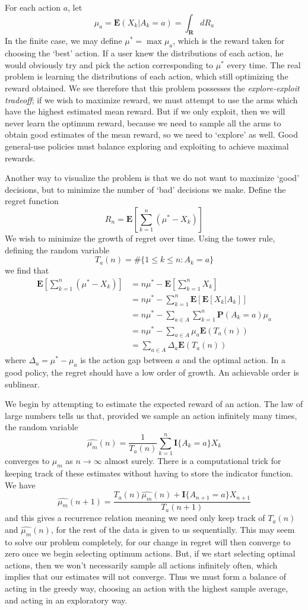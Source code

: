 For each action $a$, let
%
\[ \mu_a = \mathbf{E}(X_k | A_k = a) = \int_\mathbf{R} dR_a \]
%
In the finite case, we may define $\mu^* = \max \mu_a$, which is the reward taken for choosing the `best' action. If a user knew the distributions of each action, he would obviously try and pick the action corresponding to $\mu^*$ every time. The real problem is learning the distributions of each action, which still optimizing the reward obtained. We see therefore that this problem possesses the {\it explore-exploit tradeoff}; if we wish to maximize reward, we must attempt to use the arms which have the highest estimated mean reward. But if we only exploit, then we will never learn the optimum reward, because we need to sample all the arms to obtain good estimates of the mean reward, so we need to `explore' as well. Good general-use policies must balance exploring and exploiting to achieve maximal rewards.

Another way to visualize the problem is that we do not want to maximize `good' decisions, but to minimize the number of `bad' decisions we make. Define the regret function
%
\[ R_n = \mathbf{E}[\sum_{k = 1}^n (\mu^* - X_k)] \]
%
We wish to minimize the growth of regret over time. Using the tower rule, defining the random variable
%
\[ T_a(n) = \# \{ 1 \leq k \leq n : A_k = a \} \]
%
we find that
%
\begin{align*}
    \mathbf{E}[\sum_{k = 1}^n (\mu^* - X_k)] &= n \mu^* - \mathbf{E}[\sum_{k = 1}^n X_k]\\
    &= n \mu^* - \sum_{k = 1}^n \mathbf{E}[\mathbf{E}[X_k | A_k]]\\
    &= n \mu^* - \sum_{a \in A} \sum_{k = 1}^n \mathbf{P}(A_k = a) \mu_a\\
    &= n \mu^* - \sum_{a \in A} \mu_a \mathbf{E}(T_a(n))\\
    &= \sum_{a \in A} \Delta_a \mathbf{E}(T_a(n))
\end{align*}
%
where $\Delta_a = \mu^* - \mu_a$ is the action gap between $a$ and the optimal action. In a good policy, the regret should have a low order of growth. An achievable order is sublinear.

We begin by attempting to estimate the expected reward of an action. The law of large numbers tells us that, provided we sample an action infinitely many times, the random variable
%
\[ \widehat{\mu_m}(n) = \frac{1}{T_a(n)} \sum_{k = 1}^n \mathbf{I} \{A_k = a \} X_k \]
%
converges to $\mu_m$ as $n \to \infty$ almost surely. There is a computational trick for keeping track of these estimates without having to store the indicator function. We have
%
\[ \widehat{\mu_m}(n+1) = \frac{T_a(n) \widehat{\mu_m}(n) + \mathbf{I} \{ A_{n+1} = a \} X_{n+1}}{T_a(n+1)} \]
%
and this gives a recurrence relation meaning we need only keep track of $T_a(n)$ and $\widehat{\mu_m}(n)$, for the rest of the data is given to us sequentially. This may seem to solve our problem completely, for our change in regret will then converge to zero once we begin selecting optimum actions. But, if we start selecting optimal actions, then we won't necessarily sample all actions infinitely often, which implies that our estimates will not converge. Thus we must form a balance of acting in the greedy way, choosing an action with the highest sample average, and acting in an exploratory way.

